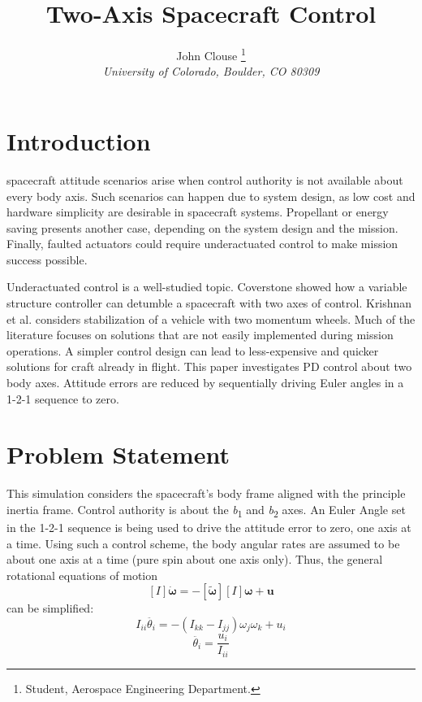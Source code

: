 \documentclass[paper]{aiaaNew}
\title{Two-Axis Spacecraft Control}
\author{
%
John Clouse%
%
  \thanks{Student,  
  Aerospace Engineering Department.}
  \\
  \emph{\normalsize University of Colorado, Boulder, CO 80309}
}
\begin{document}
\maketitle




\section{Introduction}
spacecraft attitude scenarios arise when control authority is not available about every body axis.  Such scenarios can happen due to system design, as low cost and hardware simplicity are desirable in spacecraft systems. Propellant or energy saving presents another case, depending on the system design and the mission.  Finally, faulted actuators could require underactuated control to make mission success possible.  
\par
Underactuated control is a well-studied topic.  Coverstone showed how a variable structure controller can detumble a spacecraft with two axes of control\cite{Coverstone96}.  Krishnan et al. considers stabilization of a vehicle with two momentum wheels\cite{Krishnan95}.  Much of the literature focuses on solutions that are not easily implemented during mission operations.  A simpler control design can lead to less-expensive and quicker solutions for craft already in flight.  This paper investigates PD control about two body axes.  Attitude errors are reduced by sequentially driving Euler angles in a 1-2-1 sequence to zero.  

\section{Problem Statement}
This simulation considers the spacecraft's body frame aligned with the principle inertia frame.  Control authority is about the \textit{b}\textsubscript{1} and \textit{b}\textsubscript{2} axes.  An Euler Angle set in the 1-2-1 sequence is being used to drive the attitude error to zero, one axis at a time. Using such a control scheme, the body angular rates are assumed to be about one axis at a time (pure spin about one axis only).  Thus, the general rotational equations of motion\cite{SchaubJunkins}
\[\left [ I \right ]\dot{\boldsymbol{\omega}}=-\left [ \tilde{\boldsymbol{\omega}}\right ]\left [ I \right ]\boldsymbol{\omega}+\mathbf{u}\]
can be simplified: 
\[I_{ii}\ddot{\theta_i}=-(I_{kk}-I_{jj})\omega_j\omega_k+u_i\]
\[\ddot{\theta_i}=\frac{u_i}{I_{ii}}\]
\end{document}
